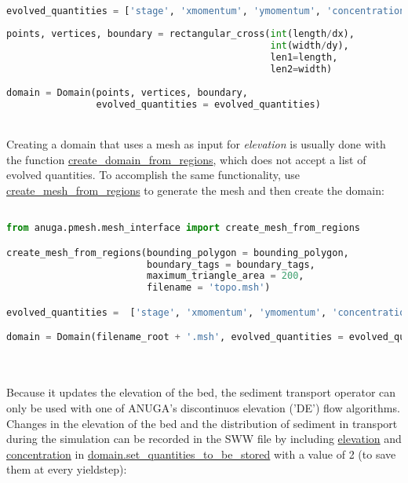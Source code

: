 \documentclass[10pt]{article}
\begin{document}
\begin{minipage}[c]{0.95\textwidth}
\begin{lstlisting}[language=Python, title=Creating a rectangular domain]

evolved_quantities = ['stage', 'xmomentum', 'ymomentum', 'concentration']
			  
points, vertices, boundary = rectangular_cross(int(length/dx),
									    	   int(width/dy),
									    	   len1=length,
									    	   len2=width)
                                                  	
domain = Domain(points, vertices, boundary,
				evolved_quantities = evolved_quantities)

\end{lstlisting}
\end{minipage}
\ \\

Creating a domain that uses a mesh as input for \textit{elevation} is usually done with the function \url{create_domain_from_regions}, which does not accept a list of evolved quantities. To accomplish the same functionality, use \url{create_mesh_from_regions} to generate the mesh and then create the domain:

\begin{minipage}[c]{0.95\textwidth}
\begin{lstlisting}[language=Python, title=Creating a domain from a mesh file]

from anuga.pmesh.mesh_interface import create_mesh_from_regions

create_mesh_from_regions(bounding_polygon = bounding_polygon,
                         boundary_tags = boundary_tags,
                         maximum_triangle_area = 200,
                         filename = 'topo.msh')

evolved_quantities =  ['stage', 'xmomentum', 'ymomentum', 'concentration']

domain = Domain(filename_root + '.msh', evolved_quantities = evolved_quantities)


\end{lstlisting}
\end{minipage}
\ \\ \ \\

Because it updates the elevation of the bed, the sediment transport operator can only be used with one of ANUGA's discontinuos elevation ('DE') flow algorithms. Changes in the elevation of the bed and the distribution of sediment in transport during the simulation can be recorded in the SWW file by including \url{elevation} and \url{concentration} in \url{domain.set_quantities_to_be_stored} with a value of 2 (to save them at every yieldstep):
\end{document}
